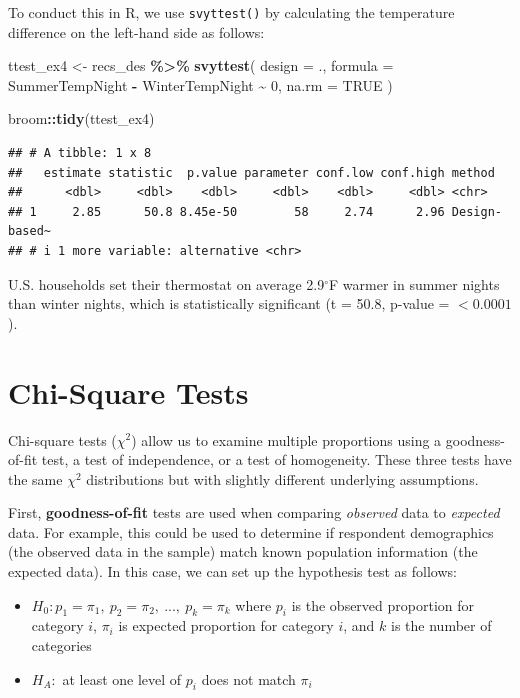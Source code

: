 \documentclass[
]{krantz}
\makeatletter
\newenvironment{Shaded}{\begin{snugshade}}{\end{snugshade}}
\newcommand{\AttributeTok}[1]{\textcolor[rgb]{0.27,0.27,0.27}{#1}}
\newcommand{\ConstantTok}[1]{\textcolor[rgb]{0.37,0.37,0.37}{#1}}
\newcommand{\DecValTok}[1]{\textcolor[rgb]{0.06,0.06,0.06}{#1}}
\newcommand{\FunctionTok}[1]{\textcolor[rgb]{0.27,0.27,0.27}{\textbf{#1}}}
\newcommand{\NormalTok}[1]{#1}
\newcommand{\OtherTok}[1]{\textcolor[rgb]{0.37,0.37,0.37}{#1}}
\newcommand{\SpecialCharTok}[1]{\textcolor[rgb]{0.43,0.43,0.43}{\textbf{#1}}}
\providecommand{\tightlist}{%
  \setlength{\itemsep}{0pt}\setlength{\parskip}{0pt}}
\newenvironment{kframe}{%
\medskip{}
\setlength{\fboxsep}{.8em}
 \def\at@end@of@kframe{}%
 \ifinner\ifhmode%
  \def\at@end@of@kframe{\end{minipage}}%
  \begin{minipage}{\columnwidth}%
 \fi\fi%
 \def\FrameCommand##1{\hskip\@totalleftmargin \hskip-\fboxsep
 \colorbox{shadecolor}{##1}\hskip-\fboxsep
     \hskip-\linewidth \hskip-\@totalleftmargin \hskip\columnwidth}%
 \MakeFramed {\advance\hsize-\width
   \@totalleftmargin\z@ \linewidth\hsize
   \@setminipage}}%
 {\par\unskip\endMakeFramed%
 \at@end@of@kframe}
\renewenvironment{Shaded}{\begin{kframe}}{\end{kframe}}
\makeatother
\begin{document}
To conduct this in R, we use \texttt{svyttest()} by calculating the temperature difference on the left-hand side as follows:

\begin{Shaded}
\begin{Highlighting}[]
\NormalTok{ttest\_ex4 }\OtherTok{\textless{}{-}}\NormalTok{ recs\_des }\SpecialCharTok{\%\textgreater{}\%}
  \FunctionTok{svyttest}\NormalTok{(}
    \AttributeTok{design =}\NormalTok{ .,}
    \AttributeTok{formula =}\NormalTok{ SummerTempNight }\SpecialCharTok{{-}}\NormalTok{ WinterTempNight }\SpecialCharTok{\textasciitilde{}} \DecValTok{0}\NormalTok{,}
    \AttributeTok{na.rm =} \ConstantTok{TRUE}
\NormalTok{  )}

\NormalTok{broom}\SpecialCharTok{::}\FunctionTok{tidy}\NormalTok{(ttest\_ex4)}
\end{Highlighting}
\end{Shaded}

\begin{verbatim}
## # A tibble: 1 x 8
##   estimate statistic  p.value parameter conf.low conf.high method       
##      <dbl>     <dbl>    <dbl>     <dbl>    <dbl>     <dbl> <chr>        
## 1     2.85      50.8 8.45e-50        58     2.74      2.96 Design-based~
## # i 1 more variable: alternative <chr>
\end{verbatim}

U.S. households set their thermostat on average 2.9\(^\circ\)F warmer in summer nights than winter nights, which is statistically significant (t = 50.8, p-value = \(<0.0001\)).

\hypertarget{stattest-chi}{%
\section{Chi-Square Tests}\label{stattest-chi}}

Chi-square tests (\(\chi^2\)) allow us to examine multiple proportions using a goodness-of-fit test, a test of independence, or a test of homogeneity. These three tests have the same \(\chi^2\) distributions but with slightly different underlying assumptions.

First, \textbf{goodness-of-fit} tests are used when comparing \emph{observed} data to \emph{expected} data. For example, this could be used to determine if respondent demographics (the observed data in the sample) match known population information (the expected data). In this case, we can set up the hypothesis test as follows:

\begin{itemize}
\tightlist
\item
  \(H_0: p_1 = \pi_1, ~ p_2 = \pi_2, ~ ..., ~ p_k = \pi_k\) where \(p_i\) is the observed proportion for category \(i\), \(\pi_i\) is expected proportion for category \(i\), and \(k\) is the number of categories
\item
  \(H_A:\) at least one level of \(p_i\) does not match \(\pi_i\)
\end{itemize}
\end{document}
